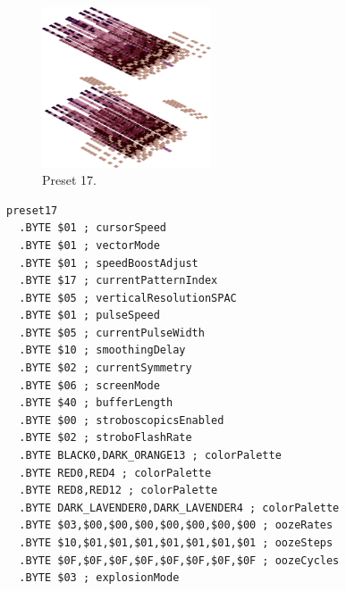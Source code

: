 \vspace*{-0.5cm}
\begin{minipage}[b]{0.48\linewidth}
\begin{figure}[H]                                                          
  \centering                                                             
  \begin{adjustbox}{width=5cm,center}                                   
  \includegraphics[width=5cm]{src/colorspace_presets/preset17-45.png}%
  \end{adjustbox}                                                        
\caption*{Preset 17.}                                           
\end{figure}                                                               
\end{minipage}
\hspace{0.1cm}
\begin{minipage}[b]{0.48\linewidth}                                                                         
\begin{lstlisting}[basicstyle=\ttfamily\tiny]
preset17
  .BYTE $01 ; cursorSpeed
  .BYTE $01 ; vectorMode
  .BYTE $01 ; speedBoostAdjust
  .BYTE $17 ; currentPatternIndex
  .BYTE $05 ; verticalResolutionSPAC
  .BYTE $01 ; pulseSpeed
  .BYTE $05 ; currentPulseWidth
  .BYTE $10 ; smoothingDelay
  .BYTE $02 ; currentSymmetry
  .BYTE $06 ; screenMode
  .BYTE $40 ; bufferLength
  .BYTE $00 ; stroboscopicsEnabled
  .BYTE $02 ; stroboFlashRate
  .BYTE BLACK0,DARK_ORANGE13 ; colorPalette
  .BYTE RED0,RED4 ; colorPalette
  .BYTE RED8,RED12 ; colorPalette
  .BYTE DARK_LAVENDER0,DARK_LAVENDER4 ; colorPalette
  .BYTE $03,$00,$00,$00,$00,$00,$00,$00 ; oozeRates
  .BYTE $10,$01,$01,$01,$01,$01,$01,$01 ; oozeSteps
  .BYTE $0F,$0F,$0F,$0F,$0F,$0F,$0F,$0F ; oozeCycles
  .BYTE $03 ; explosionMode
\end{lstlisting}
\end{minipage}


